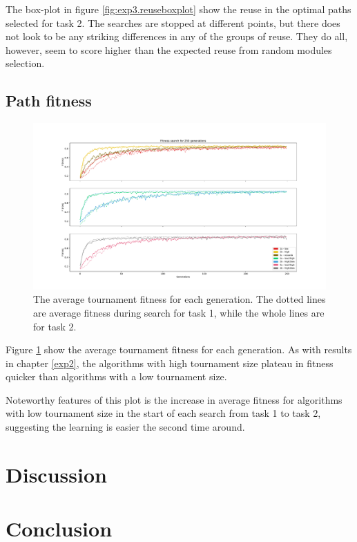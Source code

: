 The box-plot in figure \ref{fig:exp3.reuseboxplot} show the reuse in the optimal paths selected for task 2. The searches are stopped at different points, but there does not look to be any striking differences in any of the groups of reuse. They do all, however, seem to score higher than the expected reuse from random modules selection. 
\subsection{Path fitness}
\begin{figure}
    \includegraphics[width=1.25\textwidth, center]{Chapters/4.Experiments/exp3/figures/fitness_progression.pdf}
    \caption[Changes in average tournament fitness]{The average tournament fitness for each generation. The dotted lines are average fitness during search for task 1, while the whole lines are for task 2.}
    \label{fig:exp3.fitness}
\end{figure}

Figure \ref{fig:exp3.fitness} show the average tournament fitness for each generation. As with results in chapter \ref{exp2}, the algorithms with high tournament size plateau in fitness quicker than algorithms with a low tournament size.

Noteworthy features of this plot is the increase in average fitness for algorithms with low tournament size in the start of each search from task 1 to task 2, suggesting the learning is easier the second time around. 

\section{Discussion}
\section{Conclusion}
